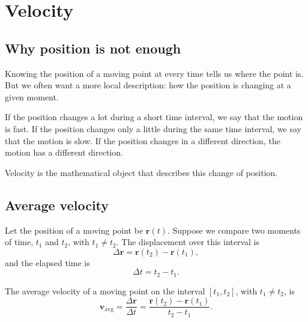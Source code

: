 \section{Velocity}

\subsection{Why position is not enough}

Knowing the position of a moving point at every time tells us where the point is. But we often want a more local description: how the position is changing at a given moment.

If the position changes a lot during a short time interval, we say that the motion is fast. If the position changes only a little during the same time interval, we say that the motion is slow. If the position changes in a different direction, the motion has a different direction.

Velocity is the mathematical object that describes this change of position.

\subsection{Average velocity}

Let the position of a moving point be \(\mathbf{r}(t)\). Suppose we compare two moments of time, \(t_1\) and \(t_2\), with \(t_1\neq t_2\). The displacement over this interval is
\[
\Delta \mathbf{r}=\mathbf{r}(t_2)-\mathbf{r}(t_1),
\]
and the elapsed time is
\[
\Delta t=t_2-t_1.
\]

\begin{definitionbox}
The average velocity of a moving point on the interval \([t_1,t_2]\), with \(t_1\neq t_2\), is
\[
\mathbf{v}_{\mathrm{avg}}
=
\frac{\Delta \mathbf{r}}{\Delta t}
=
\frac{\mathbf{r}(t_2)-\mathbf{r}(t_1)}{t_2-t_1}.
\]
\end{definitionbox}

\begin{center}
\end{center}

